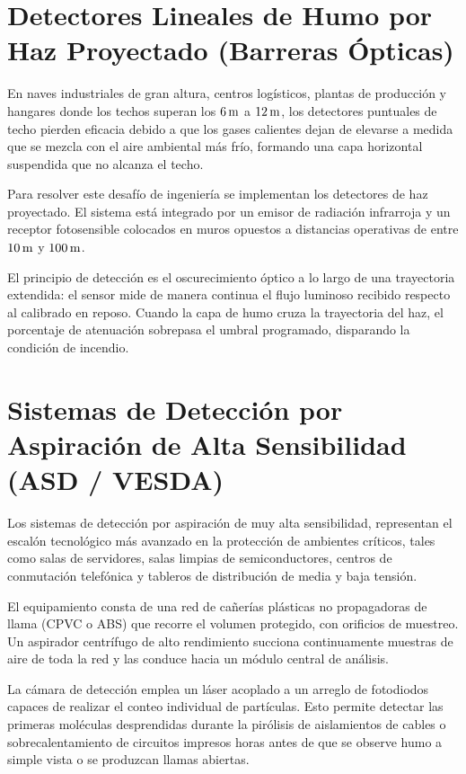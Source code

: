 \section{Detectores Lineales de Humo por Haz Proyectado (Barreras Ópticas)}

En naves industriales de gran altura, centros logísticos, plantas de producción y hangares donde los techos superan los
$6\,\mathrm{m}$ a $12\,\mathrm{m}$, los detectores puntuales de techo pierden eficacia debido a que los gases calientes dejan de elevarse 
a medida que se mezcla con el aire ambiental más frío, formando una capa horizontal suspendida que no alcanza el techo.

Para resolver este desafío de ingeniería se implementan los detectores de haz proyectado. El sistema está
integrado por un emisor de radiación infrarroja y un receptor fotosensible colocados en muros opuestos a distancias
operativas de entre $10\,\mathrm{m}$ y $100\,\mathrm{m}$.

El principio de detección es el oscurecimiento óptico a lo largo de una trayectoria extendida: el sensor mide de manera
continua el flujo luminoso recibido respecto al calibrado en reposo. Cuando la capa de humo cruza la trayectoria del
haz, el porcentaje de atenuación sobrepasa el umbral programado, disparando la condición de incendio.

\section{Sistemas de Detección por Aspiración de Alta Sensibilidad (ASD / VESDA)}

Los sistemas de detección por aspiración de muy alta sensibilidad, representan el escalón tecnológico más avanzado en la
protección de ambientes críticos, tales como salas de servidores, salas limpias de semiconductores, centros de
conmutación telefónica y tableros de distribución de media y baja tensión.

El equipamiento consta de una red de cañerías plásticas no propagadoras de llama (CPVC o ABS) que recorre el volumen
protegido, con orificios de muestreo. Un aspirador centrífugo de alto rendimiento succiona continuamente muestras de
aire de toda la red y las conduce hacia un módulo central de análisis.

La cámara de detección emplea un láser acoplado a un arreglo de fotodiodos capaces de realizar el conteo individual de
partículas. Esto permite detectar las primeras moléculas desprendidas durante la pirólisis de aislamientos de cables o
sobrecalentamiento de circuitos impresos horas antes de que se observe humo a simple vista o se produzcan llamas
abiertas.

